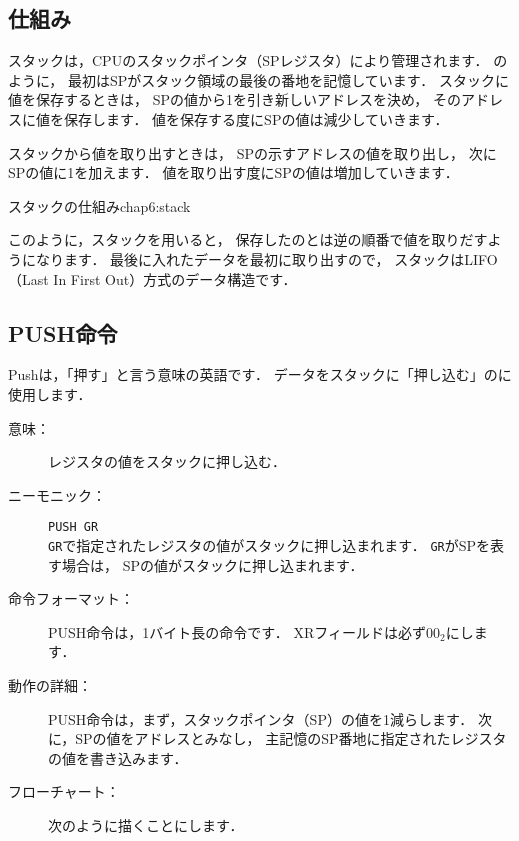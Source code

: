 \subsection{仕組み}

スタックは，CPUのスタックポインタ（SPレジスタ）により管理されます．
のように，
最初はSPがスタック領域の最後の番地を記憶しています．
スタックに値を保存するときは，
SPの値から1を引き新しいアドレスを決め，
そのアドレスに値を保存します．
値を保存する度にSPの値は減少していきます．

スタックから値を取り出すときは，
SPの示すアドレスの値を取り出し，
次にSPの値に1を加えます．
値を取り出す度にSPの値は増加していきます．

{スタックの仕組み}{chap6:stack}

このように，スタックを用いると，
保存したのとは逆の順番で値を取りだすようになります．
最後に入れたデータを最初に取り出すので，
スタックはLIFO（Last In First Out）方式のデータ構造です．

\subsection{PUSH命令}

Pushは，「押す」と言う意味の英語です．
データをスタックに「押し込む」のに使用します．

\begin{description}
\item[意味：]レジスタの値をスタックに押し込む．

\item[ニーモニック：]{\tt PUSH  GR} \\
{\tt GR}で指定されたレジスタの値がスタックに押し込まれます．
{\tt GR}がSPを表す場合は，
SPの値がスタックに押し込まれます．

\item[命令フォーマット：]PUSH命令は，1バイト長の命令です．
XRフィールドは必ず$00_2$にします．


\item[動作の詳細：]PUSH命令は，まず，スタックポインタ（SP）の値を1減らします．
次に，SPの値をアドレスとみなし，
主記憶のSP番地に指定されたレジスタの値を書き込みます．

\item[フローチャート：]
次のように描くことにします．

\begin{center}
\end{center}

\end{description}

